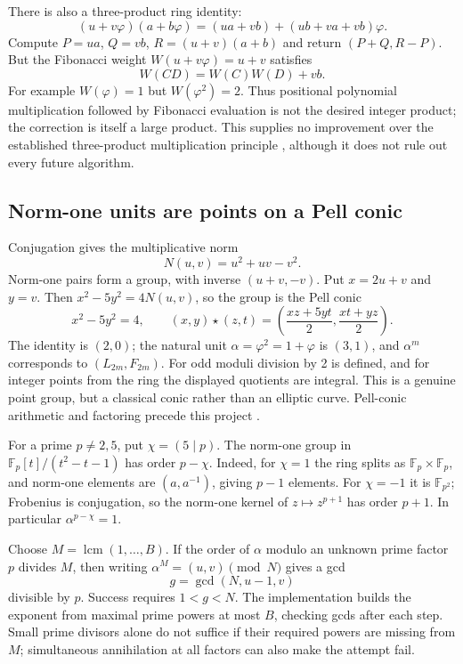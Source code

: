 \documentclass[11pt]{article}
\theoremstyle{definition}\newtheorem{definition}[theorem]{Definition}
\newcommand{\ph}{\varphi}
\begin{document}
There is also a three-product ring identity:
\[
(u+v\ph)(a+b\ph)=(ua+vb)+(ub+va+vb)\ph.
\]
Compute $P=ua$, $Q=vb$, $R=(u+v)(a+b)$ and return $(P+Q,R-P)$.
But the Fibonacci weight $W(u+v\ph)=u+v$ satisfies
\[
 W(CD)=W(C)W(D)+vb.
\]
For example $W(\ph)=1$ but $W(\ph^2)=2$. Thus positional polynomial
multiplication followed by Fibonacci evaluation is not the desired integer
product; the correction is itself a large product. This supplies no
improvement over the established three-product multiplication principle
\cite{gmp}, although it does not rule out every future algorithm.

\subsection{Norm-one units are points on a Pell conic}
Conjugation gives the multiplicative norm
\[
 N(u,v)=u^2+uv-v^2.
\]
Norm-one pairs form a group, with inverse $(u+v,-v)$. Put $x=2u+v$
and $y=v$. Then $x^2-5y^2=4N(u,v)$, so the group is the Pell conic
\[
 x^2-5y^2=4,\qquad
 (x,y)\star(z,t)=\left(\frac{xz+5yt}{2},\frac{xt+yz}{2}\right).
\]
The identity is $(2,0)$; the natural unit $\alpha=\ph^2=1+\ph$
is $(3,1)$, and $\alpha^m$ corresponds to $(L_{2m},F_{2m})$.
For odd moduli division by 2 is defined, and for integer points from
the ring the displayed quotients are integral. This is a genuine point
group, but a classical conic rather than an elliptic curve. Pell-conic
arithmetic and factoring precede this project \cite{pell,pellfactor}.

For a prime $p\ne2,5$, put $\chi=(5\mid p)$. The norm-one group
in $\mathbb F_p[t]/(t^2-t-1)$ has order $p-\chi$.
Indeed, for $\chi=1$ the ring splits as $\mathbb F_p\times\mathbb F_p$,
and norm-one elements are $(a,a^{-1})$, giving $p-1$ elements.
For $\chi=-1$ it is $\mathbb F_{p^2}$; Frobenius is conjugation,
so the norm-one kernel of $z\mapsto z^{p+1}$ has order $p+1$.
In particular $\alpha^{p-\chi}=1$.

Choose $M=\operatorname{lcm}(1,\ldots,B)$. If the order of $\alpha$
modulo an unknown prime factor $p$ divides $M$, then writing
$\alpha^M=(u,v)\pmod N$ gives a gcd
\[
 g=\gcd(N,u-1,v)
\]
divisible by $p$. Success requires $1<g<N$. The implementation
builds the exponent from maximal prime powers at most $B$, checking
gcds after each step. Small prime divisors alone do not suffice if their
required powers are missing from $M$; simultaneous annihilation at all
factors can also make the attempt fail.
\end{document}
